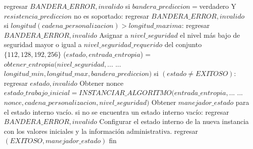 \begin{description}
\begin{pseudocodigo}[caption={DRBG, instanciación.}, label={drbg:1}]
          regresar $BANDERA\_ERROR, invalido$
        si $bandera\_prediccion = $verdadero Y $resistencia\_prediccion$ no es soportado:
          regresar $BANDERA\_ERROR, invalido$
        si $longitud(cadena\_personalizacion) > longitud\_maxima$:
          regresar $BANDERA\_ERROR, invalido$
        Asignar a $nivel\_seguridad$ el nivel más bajo de seguridad mayor o igual
          a $nivel\_seguridad\_requerido$ del conjunto $\{112, 128, 192, 256\}$
        ($estado, entrada\_entropia$) = $obtener\_entropia(nivel\_seguridad,$...
          ... $longitud\_min, longitud\_max, bandera\_prediccion)$
        si $(estado \neq EXITOSO)$:
          regresar $estado, invalido$ 
        Obtener nonce
        $estado\_trabajo\_inicial = INSTANCIAR\_ALGORITMO(entrada\_entropia,$...
          ... $nonce, cadena\_personalizacion, nivel\_seguridad)$
        Obtener $manejador\_estado$ para el estado interno vacío. 
        si no se encuentra un estado interno vacío:
          regresar $BANDERA\_ERROR, invalido$
        Configurar el estado interno de la nueva instancia con los valores iniciales
          y la información administrativa.
        regresar $(EXITOSO, manejador\_estado)$
      fin
    \end{pseudocodigo}
\end{description}